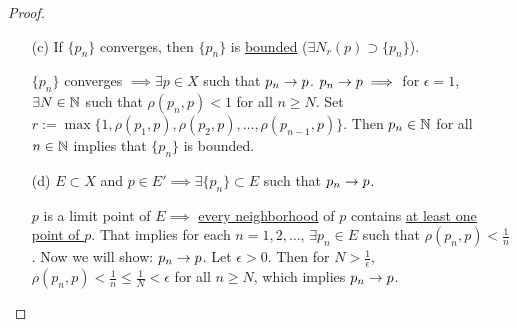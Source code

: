 \documentclass[]{article}
\begin{document}
\begin{proof}
\begin{enumerate}
		\item[(c)] If $\{p_n\}$ converges, then $\{p_n\}$ is \ul{bounded} ($\exists N_r(p) \supset \{ p_n\}$).

			$\{p_n\}$ converges $\implies \exists p\in X$ such that $p_n\rightarrow p$.
			$p_n\rightarrow p \implies$ for $\epsilon = 1$, $\exists N\in\mathbb{N}$ such that $\rho(p_n,p) < 1$ for all $n\geq N$.
			Set $r:= \max\{1,\rho(p_1,p),\rho(p_2,p),\dots,\rho(p_{n-1},p)\}$.
			Then $p_n\in\mathbb{N}$ for all $n\in\mathbb{N}$ implies that $ \{p_n\}$ is bounded.

		\item[(d)] $E\subset X$ and $p\in E' \implies \exists \{p_n\}\subset E$ such that $p_n\rightarrow p$.
			
			$p$ is a limit point of $E \implies$ \ul{every neighborhood} of $p$ contains \ul{at least one point of $p$}.
			That implies for each $n = 1,2,\dots$, $\exists p_n\in E$ such that $\rho(p_n,p) < \frac{1}{n}$. Now we will show: $p_n\rightarrow p$.
			Let $\epsilon > 0$. Then for $N > \frac{1}{\epsilon}$, $\rho(p_n,p) < \frac{1}{n} \leq \frac{1}{N} < \epsilon$ for all $n\geq N$, which implies $p_n\rightarrow p$.
	\end{enumerate}
\end{proof}
\end{document}
